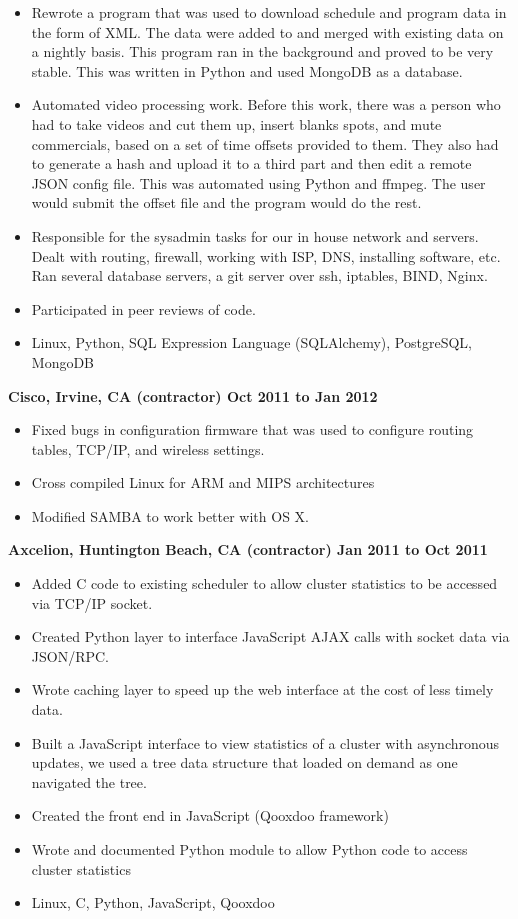 \documentclass{res}
\begin{document}
\begin{resume}
\begin{itemize}
\item Rewrote a program that was used to download schedule and program
data in the form of XML.  The data were added to and merged with existing
data on a nightly basis.  This program ran in the background and
proved to be very stable.  This was written in Python and used
MongoDB as a database.

\item Automated video processing work.  Before this work, there
was a person who had to take videos and cut them up, insert blanks spots,
and mute commercials, based on a set of time offsets provided to them.  They
also had to generate a hash and upload it to a third part and then edit
a remote JSON config file.  This was automated using Python and ffmpeg.
The user would submit the offset file and the program would do the rest.

\item Responsible for the sysadmin tasks for our in house
network and servers.  Dealt with routing, firewall, working with ISP,
DNS, installing software, etc.  Ran several database servers, a git
server over ssh, iptables, BIND, Nginx.  

\item Participated in peer reviews of code.

\item Linux, Python, SQL Expression Language (SQLAlchemy), PostgreSQL, MongoDB
\end{itemize}

{\large \bf Cisco, Irvine, CA (contractor) \hfill Oct 2011 to Jan 2012}
\begin{itemize}
\item Fixed bugs in configuration firmware that was used to configure
 routing tables, TCP/IP, and wireless settings.
\item Cross compiled Linux for ARM and MIPS architectures
\item Modified SAMBA to work better with OS X.
\end{itemize}

{\large \bf Axcelion, Huntington Beach, CA (contractor) \hfill Jan 2011 to Oct 2011}
\begin{itemize}
\item Added  C code to existing scheduler to allow cluster statistics to
be accessed via TCP/IP socket.
\item Created Python layer to interface JavaScript AJAX calls with
socket data via JSON/RPC.
\item Wrote caching layer to speed up the web interface at the cost of
less timely data.
\item Built a JavaScript interface to view statistics of a cluster with
asynchronous updates, we used a tree data structure that loaded on
demand as one navigated the tree.
\item Created the front end in JavaScript (Qooxdoo framework)
\item Wrote and documented Python module to allow Python code to
access cluster statistics
\item Linux, C, Python, JavaScript, Qooxdoo
\end{itemize}


\end{resume}
\end{document}
